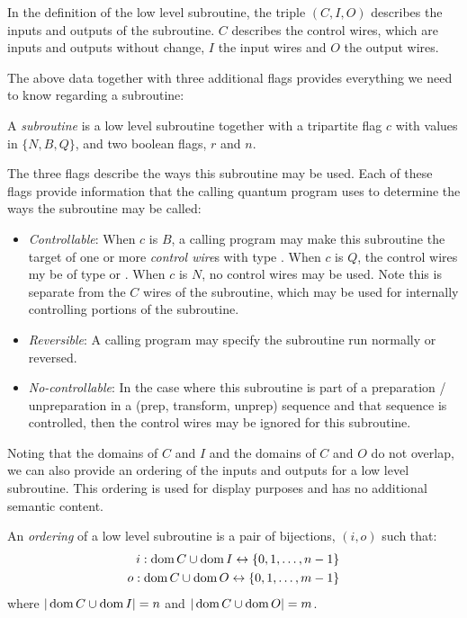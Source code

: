 In the definition of the low level subroutine, the triple $(C,I,O)$ describes the inputs and
outputs of the subroutine. $C$ describes the control wires, which are inputs and outputs without
change, $I$ the input wires and $O$ the output wires.

The above data together with three additional flags provides everything we need to know regarding a
subroutine:
\begin{definition}\label{def:subroutine}
  A \emph{subroutine} is a low level subroutine together with a tripartite flag $c$ with values in
  $\{N,B,Q\}$, and two boolean flags, $r$ and $n$.
\end{definition}
The three flags describe the ways this subroutine may be used. Each of these flags provide
information that the calling quantum program uses to determine the ways the subroutine may be
called:
\begin{itemize}
  \item \emph{Controllable}: When $c$ is $B$, a calling program may make this subroutine the target
    of one or more \emph{control wire}s with type \bit. When $c$ is $Q$, the control wires my be of
    type \bit or \qubit. When $c$ is $N$, no control wires may be used. Note this is separate from
    the $C$ wires of the subroutine, which may be used for internally controlling portions of the
    subroutine.
  \item \emph{Reversible}: A calling program may specify the subroutine run normally or reversed.
  \item \emph{No-controllable}: In the case where this subroutine is part of a preparation /
    unpreparation in a (prep, transform, unprep) sequence and that sequence is controlled, then the
    control wires may be ignored for this subroutine.
\end{itemize}

Noting that the domains of $C$ and $I$ and the domains of $C$ and $O$ do not overlap, we can also
provide an ordering of the inputs and outputs for a low level subroutine. This ordering is used for
display purposes and has no additional semantic content.

\begin{definition}\label{def:low_level_subroutine_ordering}
  An \emph{ordering} of a low level subroutine is a pair of bijections, $(i,o)$ such that:
  \begin{align}
    i: \operatorname*{dom} C \cup \operatorname*{dom} I \leftrightarrow \{0,1,\ldots,n-1\}\\
    o: \operatorname*{dom} C \cup \operatorname*{dom} O \leftrightarrow \{0,1,\ldots,m-1\}
  \end{align}
  where $|\operatorname*{dom} C \cup \operatorname*{dom} I| = n$ and $|\operatorname*{dom} C \cup \operatorname*{dom} O| = m$.
\end{definition}

